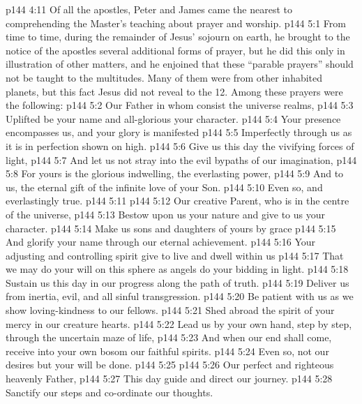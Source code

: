 \vs p144 4:11 Of all the apostles, Peter and James came the nearest to comprehending the Master’s teaching about prayer and worship.
\vs p144 5:1 From time to time, during the remainder of Jesus’ sojourn on earth, he brought to the notice of the apostles several additional forms of prayer, but he did this only in illustration of other matters, and he enjoined that these “parable prayers” should not be taught to the multitudes. Many of them were from other inhabited planets, but this fact Jesus did not reveal to the 12. Among these prayers were the following:
\vspace*{1ex}
\vs p144 5:2 Our Father in whom consist the universe realms,
\vs p144 5:3 \hsetoff Uplifted be your name and all\hyp{}glorious your character.
\vs p144 5:4 Your presence encompasses us, and your glory is manifested
\vs p144 5:5 \hsetoff Imperfectly through us as it is in perfection shown on high.
\vs p144 5:6 Give us this day the vivifying forces of light,
\vs p144 5:7 \hsetoff And let us not stray into the evil bypaths of our imagination,
\vs p144 5:8 For yours is the glorious indwelling, the everlasting power,
\vs p144 5:9 \hsetoff And to us, the eternal gift of the infinite love of your Son.
\vs p144 5:10 Even so, and everlastingly true.
\vs p144 5:11 \separatorshort
\vs p144 5:12 Our creative Parent, who is in the centre of the universe,
\vs p144 5:13 \hsetoff Bestow upon us your nature and give to us your character.
\vs p144 5:14 Make us sons and daughters of yours by grace
\vs p144 5:15 \hsetoff And glorify your name through our eternal achievement.
\vs p144 5:16 Your adjusting and controlling spirit give to live and dwell within us
\vs p144 5:17 \hsetoff That we may do your will on this sphere as angels do your bidding in light.
\vs p144 5:18 Sustain us this day in our progress along the path of truth.
\vs p144 5:19 \hsetoff Deliver us from inertia, evil, and all sinful transgression.
\vs p144 5:20 Be patient with us as we show loving\hyp{}kindness to our fellows.
\vs p144 5:21 \hsetoff Shed abroad the spirit of your mercy in our creature hearts.
\vs p144 5:22 Lead us by your own hand, step by step, through the uncertain maze of life,
\vs p144 5:23 \hsetoff And when our end shall come, receive into your own bosom our faithful spirits.
\vs p144 5:24 Even so, not our desires but your will be done.
\vs p144 5:25 \separatorshort
\vs p144 5:26 Our perfect and righteous heavenly Father,
\vs p144 5:27 \hsetoff This day guide and direct our journey.
\vs p144 5:28 Sanctify our steps and co\hyp{}ordinate our thoughts.
